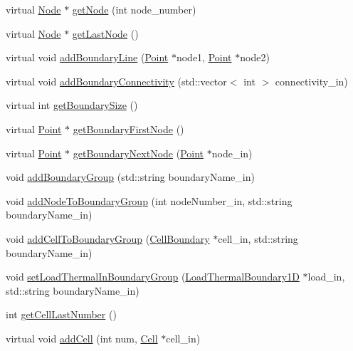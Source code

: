 \begin{DoxyCompactItemize}
\item 
virtual \hyperlink{classmknix_1_1_node}{Node} $\ast$ \hyperlink{classmknix_1_1_body_abb933258861ddadd9d7c7792e9303e02}{get\+Node} (int node\+\_\+number)
\item 
virtual \hyperlink{classmknix_1_1_node}{Node} $\ast$ \hyperlink{classmknix_1_1_body_a95fad3fdd4c18a0adcbeba2891b55140}{get\+Last\+Node} ()
\item 
virtual void \hyperlink{classmknix_1_1_body_a023da531b8383f798f4ef31bad1cff60}{add\+Boundary\+Line} (\hyperlink{classmknix_1_1_point}{Point} $\ast$node1, \hyperlink{classmknix_1_1_point}{Point} $\ast$node2)
\item 
virtual void \hyperlink{classmknix_1_1_body_a9b3e566b0c8758701f1583667caf6657}{add\+Boundary\+Connectivity} (std\+::vector$<$ int $>$ connectivity\+\_\+in)
\item 
virtual int \hyperlink{classmknix_1_1_body_aa7de934eb85ec4e68741d0c7395a9a10}{get\+Boundary\+Size} ()
\item 
virtual \hyperlink{classmknix_1_1_point}{Point} $\ast$ \hyperlink{classmknix_1_1_body_a030d73d6f97c9fc81220ca0d21cfa4c1}{get\+Boundary\+First\+Node} ()
\item 
virtual \hyperlink{classmknix_1_1_point}{Point} $\ast$ \hyperlink{classmknix_1_1_body_abadb51ea072fcd48be388467507c4fb0}{get\+Boundary\+Next\+Node} (\hyperlink{classmknix_1_1_point}{Point} $\ast$node\+\_\+in)
\item 
void \hyperlink{classmknix_1_1_body_ab83a1a1e344d3cacb0319da5f579ce93}{add\+Boundary\+Group} (std\+::string boundary\+Name\+\_\+in)
\item 
void \hyperlink{classmknix_1_1_body_a8ee89e6b0f3bf8bbb20a3435e5a42c3d}{add\+Node\+To\+Boundary\+Group} (int node\+Number\+\_\+in, std\+::string boundary\+Name\+\_\+in)
\item 
void \hyperlink{classmknix_1_1_body_ae9c1eb483544a2a0c113dae3843184fe}{add\+Cell\+To\+Boundary\+Group} (\hyperlink{classmknix_1_1_cell_boundary}{Cell\+Boundary} $\ast$cell\+\_\+in, std\+::string boundary\+Name\+\_\+in)
\item 
void \hyperlink{classmknix_1_1_body_ad3c25b3400585c33a55e82ba8898f760}{set\+Load\+Thermal\+In\+Boundary\+Group} (\hyperlink{classmknix_1_1_load_thermal_boundary1_d}{Load\+Thermal\+Boundary1\+D} $\ast$load\+\_\+in, std\+::string boundary\+Name\+\_\+in)
\item 
int \hyperlink{classmknix_1_1_body_a60025d1f29dad28094719a92335b0450}{get\+Cell\+Last\+Number} ()
\item 
virtual void \hyperlink{classmknix_1_1_body_abb4237e7f457287766e29bfe0cbb0f01}{add\+Cell} (int num, \hyperlink{classmknix_1_1_cell}{Cell} $\ast$cell\+\_\+in)

\end{DoxyCompactItemize}
